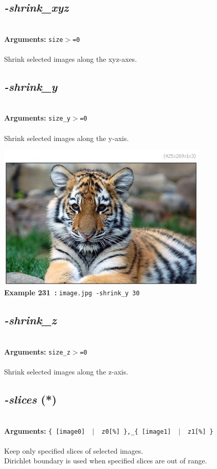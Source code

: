 \documentclass[a4paper,11pt,twoside]{book}
\begin{document}
\subsection{\emph{-shrink\_xyz} }\vspace*{-0.5em}
~\\\textbf{Arguments: } 
{\small \texttt{size$>$=0}}\\~\\
Shrink selected images along the xyz-axes.


\subsection{\emph{-shrink\_y} }\vspace*{-0.5em}
~\\\textbf{Arguments: } 
{\small \texttt{size\_y$>$=0}}\\~\\
Shrink selected images along the y-axis.
\begin{center}\includegraphics[keepaspectratio=true,height=7cm,width=\textwidth]{img/gmic_def231.jpg}\\
{\footnotesize \textbf{Example 231~:} \texttt{image.jpg -shrink\_y 30}}
\end{center}

\subsection{\emph{-shrink\_z} }\vspace*{-0.5em}
~\\\textbf{Arguments: } 
{\small \texttt{size\_z$>$=0}}\\~\\
Shrink selected images along the z-axis.


\subsection{\emph{-slices} (*)}\vspace*{-0.5em}
~\\\textbf{Arguments: } 
{\small \texttt{\{ [image0] ~$|$~ z0[\%] \},\_\{ [image1] ~$|$~ z1[\%] \}}}\\~\\
Keep only specified slices of selected images.
~\\Dirichlet boundary is used when specified slices are out of range.
\end{document}
